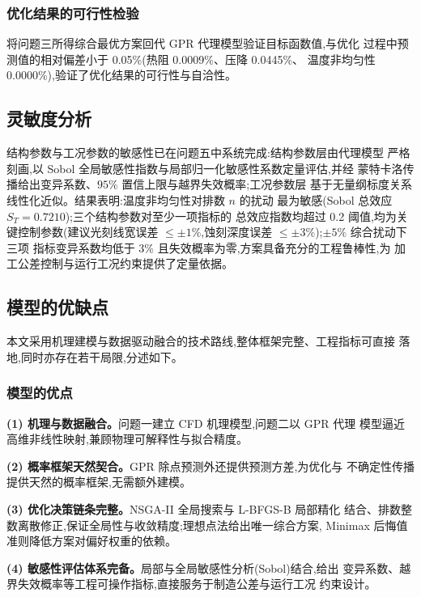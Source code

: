 \subsubsection{优化结果的可行性检验}

将问题三所得综合最优方案回代 GPR 代理模型验证目标函数值,与优化
过程中预测值的相对偏差小于 0.05\%(热阻 0.0009\%、压降 0.0445\%、
温度非均匀性 0.0000\%),验证了优化结果的可行性与自洽性。

\subsection{灵敏度分析}

结构参数与工况参数的敏感性已在问题五中系统完成:结构参数层由代理模型
严格刻画,以 Sobol 全局敏感性指数与局部归一化敏感性系数定量评估,并经
蒙特卡洛传播给出变异系数、$95\%$ 置信上限与越界失效概率;工况参数层
基于无量纲标度关系线性化近似。结果表明:温度非均匀性对排数 $n$ 的扰动
最为敏感(Sobol 总效应 $S_T=0.7210$);三个结构参数对至少一项指标的
总效应指数均超过 0.2 阈值,均为关键控制参数(建议光刻线宽误差
$\le\pm 1\%$,蚀刻深度误差 $\le\pm 3\%$);$\pm 5\%$ 综合扰动下三项
指标变异系数均低于 3\% 且失效概率为零,方案具备充分的工程鲁棒性,为
加工公差控制与运行工况约束提供了定量依据。

\subsection{模型的优缺点}

本文采用机理建模与数据驱动融合的技术路线,整体框架完整、工程指标可直接
落地,同时亦存在若干局限,分述如下。

\subsubsection{模型的优点}

\textbf{(1) 机理与数据融合。}问题一建立 CFD 机理模型,问题二以 GPR 代理
模型逼近高维非线性映射,兼顾物理可解释性与拟合精度。

\textbf{(2) 概率框架天然契合。}GPR 除点预测外还提供预测方差,为优化与
不确定性传播提供天然的概率框架,无需额外建模。

\textbf{(3) 优化决策链条完整。}NSGA-II 全局搜索与 L-BFGS-B 局部精化
结合、排数整数离散修正,保证全局性与收敛精度;理想点法给出唯一综合方案,
Minimax 后悔值准则降低方案对偏好权重的依赖。

\textbf{(4) 敏感性评估体系完备。}局部与全局敏感性分析(Sobol)结合,给出
变异系数、越界失效概率等工程可操作指标,直接服务于制造公差与运行工况
约束设计。

